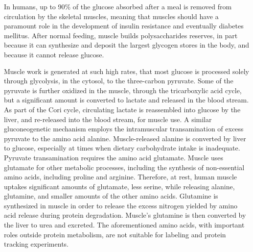 \documentclass[12pt,english]{report}\usepackage[]{graphicx}\usepackage[]{color}
\begin{document}
In humans, up to 90\% of the glucose absorbed after a meal is removed
from circulation by the skeletal muscles\citep{defronzo1981effect,katz1983splanchnic},
meaning that muscles should have a paramount role in the development
of insulin resistance and eventually diabetes mellitus. After normal
feeding, muscle builds polysaccharides reserves, in part because it
can synthesize and deposit the largest glycogen stores in the body,
and because it cannot release glucose. 

Muscle work is generated at such high rates, that most glucose is
processed solely through glycolysis, in the cytosol, to the three-carbon
pyruvate. Some of the pyruvate is further oxidized in the muscle,
through the tricarboxylic acid cycle, but a significant amount is
converted to lactate and released in the blood stream. As part of
the Cori cycle, circulating lactate is reassembled into glucose by
the liver, and re-released into the blood stream, for muscle use.
A similar gluconeogenetic mechanism employs the intramuscular transamination
of excess pyruvate to the amino acid alanine. Muscle-released alanine
is converted by liver to glucose, especially at times when dietary
carbohydrate intake is inadequate. Pyruvate transamination requires
the amino acid glutamate. Muscle uses glutamate for other metabolic
processes, including the synthesis of non-essential amino acids, including
proline and arginine. Therefore, at rest, human muscle uptakes significant
amounts of glutamate, less serine, while releasing alanine, glutamine,
and smaller amounts of the other amino acids\citep{gelfand1986removal}.
Glutamine is synthesized in muscle in order to release the excess
nitrogen yielded by amino acid release during protein degradation.
Muscle's glutamine is then converted by the liver to urea and excreted.
The aforementioned amino acids, with important roles outside protein
metabolism, are not suitable for labeling and protein tracking experiments.
\end{document}
